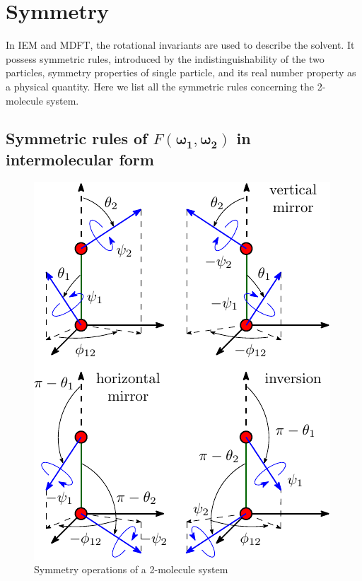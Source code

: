 \section{Symmetry}

In IEM and MDFT, the rotational invariants are used to describe the
solvent. It possess symmetric rules, introduced by the indistinguishability
of the two particles, symmetry properties of single particle, and
its real number property as a physical quantity. Here we list all
the symmetric rules concerning the 2-molecule system.

\subsection{Symmetric rules of $F(\boldsymbol{\omega_{1}},\boldsymbol{\omega_{2}})$
in intermolecular form}

\begin{figure}[h]
\begin{centering}
\includegraphics{_figure/symmetry_dcf}
\par\end{centering}
\caption{Symmetry operations of a 2-molecule system\label{fig:Symmetry-operations}}
\end{figure}


